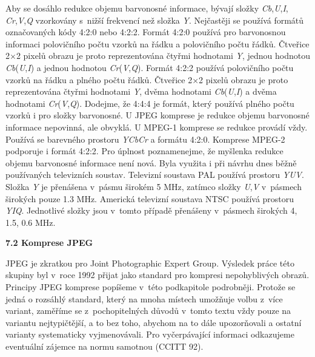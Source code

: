 \noindent Aby se dosáhlo redukce objemu barvonosné informace, bývají složky \textit{Cb},\textit{U},\textit{I}, \textit{Cr},\textit{V},\textit{Q} vzorkovány s~nižší frekvencí než složka \textit{Y}. Nejčastěji se používá formátů označovaných kódy 4:2:0 nebo 4:2:2. Formát 4:2:0 používá pro barvonosnou informaci polovičního počtu vzorků na řádku a polovičního počtu řádků. Čtveřice 2$\times$2 pixelů obrazu je proto reprezentována čtyřmi hodnotami \textit{Y}, jednou hodnotou \textit{Cb}(\textit{U},\textit{I}) a jednou hodnotou \textit{Cr}(\textit{V},\textit{Q}). Formát 4:2:2 používá polovičního počtu vzorků na řádku a plného počtu řádků. Čtveřice 2$\times$2 pixelů obrazu je proto reprezentována čtyřmi hodnotami \textit{Y}, dvěma hodnotami \textit{Cb}(\textit{U},\textit{I}) a dvěma hodnotami \textit{Cr}(\textit{V},\textit{Q}). Dodejme, že 4:4:4 je formát, který používá plného počtu vzorků i pro složky barvonosné. U JPEG komprese je redukce objemu barvonosné informace nepovinná, ale obvyklá. U MPEG-1 komprese se redukce provádí vždy. Používá se barevného prostoru \textit{YCbCr} a formátu 4:2:0. Komprese MPEG-2 podporuje i formát 4:2:2. Pro úplnost poznamenejme, že myšlenka redukce objemu barvonosné informace není nová. Byla využita i při návrhu dnes běžně používaných televizních soustav. Televizní soustava PAL používá prostoru \textit{YUV}. Složka \textit{Y} je přenášena v~pásmu širokém 5 MHz, zatímco složky \textit{U},\textit{V} v~pásmech širokých pouze 1.3 MHz. Americká televizní soustava NTSC používá prostoru \textit{YIQ}. Jednotlivé složky jsou v~tomto případě přenášeny v~pásmech širokých 4, 1.5, 0.6 MHz.

\noindent \textbf{7.2  Komprese JPEG}

\noindent JPEG je zkratkou pro Joint Photographic Expert Group. Výsledek práce této skupiny byl v~roce 1992 přijat jako standard pro kompresi nepohyblivých obrazů. Principy JPEG komprese popíšeme v~této podkapitole podrobněji. Protože se jedná o rozsáhlý standard, který na mnoha místech umožňuje volbu z~více variant, zaměříme se z~pochopitelných důvodů v~tomto textu vždy pouze na variantu nejtypičtější, a to bez toho, abychom na to dále upozorňovali a ostatní varianty systematicky vyjmenovávali. Pro vyčerpávající informaci odkazujeme eventuální zájemce na normu samotnou (CCITT 92).

\noindent 

\noindent 

